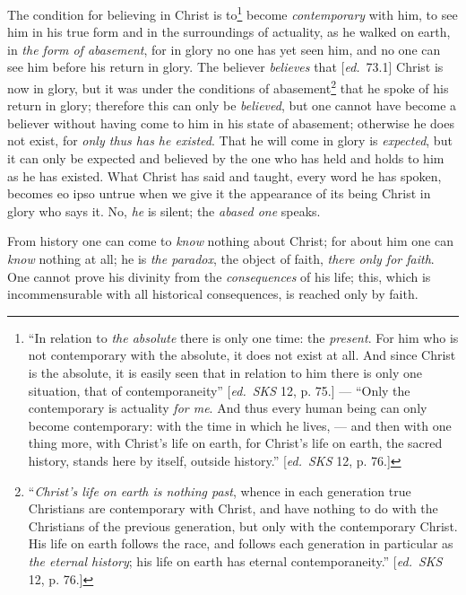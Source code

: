 \documentclass[12pt,a4paper,openany]{book}
\newcommand{\kpage}[1]{\marginnote{\footnotesize\textit{[#1]}}}
\newcommand{\ed}[1]{{\small[\textit{ed.}\ #1]}}
\begin{document}
The condition for believing in Christ is to\footnote[86]{``In relation to \emph{the absolute} there is only one time: the \emph{present}. For him who is not
contemporary with the absolute, it does not exist at all. And since Christ is the absolute,
it is easily seen that in relation to him there is only one situation, that of contemporaneity'' \ed{\emph{SKS} 12,
p. 75.} --- ``Only the contemporary is actuality \emph{for me}. And thus every human being
can only become contemporary: with the time in which he lives, --- and then with one thing more, with
Christ's life on earth, for Christ's life on earth, the sacred history, stands here by
itself, outside history.'' \ed{\emph{SKS} 12, p. 76.}}
become \emph{contemporary} with him,
to see him in his true form and in the surroundings of actuality,
as he walked on earth, in \emph{the form of abasement}, for in glory no one has
yet seen him, and no one can see him before his return in
glory. The believer \emph{believes} that \ed{73.1} Christ is now in glory,
but it was under the conditions of abasement\footnote[87]{``\emph{Christ's life on earth is nothing past}, whence in each generation true Christians
are contemporary with Christ, and have nothing to do with the Christians of the previous
generation, but only with the contemporary Christ. His life on earth follows the race,
and follows each generation in particular as \emph{the eternal history}; his life on earth has eternal
contemporaneity.'' \ed{\emph{SKS} 12, p. 76.}}
that he spoke of his return
in glory; therefore this can only be \emph{believed}, but one cannot
\kpage{153}have become a believer without having come to him in his state of
abasement; otherwise he does not exist, for \emph{only thus has he existed}.
That he will come in glory is \emph{expected}, but it can only be expected
and believed by the one who has held and holds to him as he has
existed. What Christ has said and taught, every word he has spoken,
becomes eo ipso untrue when we give it the appearance of its being Christ
in glory who says it. No, \emph{he} is silent; the \emph{abased one} speaks.

From history one can come to \emph{know} nothing about Christ; for about
him one can \emph{know} nothing at all; he is \emph{the paradox}, the object
of faith, \emph{there only for faith}. One cannot prove his divinity from the \emph{consequences} of his life;
this, which is incommensurable with all historical
consequences, is reached only by faith.
\end{document}
